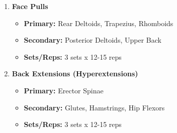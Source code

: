 \documentclass{article}
\begin{document}
\begin{enumerate}[label=\arabic*., wide=0pt, leftmargin=*]
    \item \textbf{Face Pulls}
        \begin{itemize}[label=\textbullet, leftmargin=*, nosep, topsep=0pt, partopsep=0pt]
            \item \textbf{Primary:} Rear Deltoids, Trapezius, Rhomboids
            \item \textbf{Secondary:} Posterior Deltoids, Upper Back
            \item \textbf{Sets/Reps:} 3 sets x 12-15 reps
        \end{itemize}

    \item \textbf{Back Extensions (Hyperextensions)}
        \begin{itemize}[label=\textbullet, leftmargin=*, nosep, topsep=0pt, partopsep=0pt]
            \item \textbf{Primary:} Erector Spinae
            \item \textbf{Secondary:} Glutes, Hamstrings, Hip Flexors
            \item \textbf{Sets/Reps:} 3 sets x 12-15 reps
        \end{itemize}
\end{enumerate}
\end{document}
